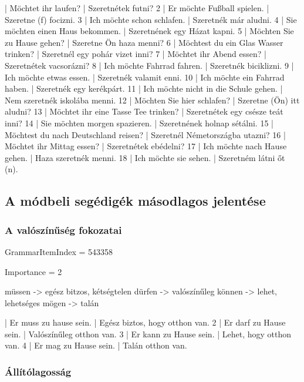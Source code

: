 \documentclass{article}
\newenvironment{desc}{\verbatim}{\endverbatim}
\newenvironment{exmp}{\verbatim}{\endverbatim}
\begin{document}
\begin{exmp}
1 | Möchtet ihr laufen? | Szeretnétek futni?
2 | Er möchte Fußball spielen. | Szeretne (f) focizni.
3 | Ich möchte schon schlafen. | Szeretnék már aludni.
4 | Sie möchten einen Haus bekommen. | Szeretnének egy Házat kapni.
5 | Möchten Sie zu Hause gehen? | Szeretne Ön haza menni?
6 | Möchtest du ein Glas Wasser trinken? | Szeretnél egy pohár vizet inni?
7 | Möchtet ihr Abend essen? | Szeretnétek vacsorázni?
8 | Ich möchte Fahrrad fahren. | Szeretnék biciklizni.
9 | Ich möchte etwas essen. | Szeretnék valamit enni.
10 | Ich möchte ein Fahrrad haben. | Szeretnék egy kerékpárt.
11 | Ich möchte nicht in die Schule gehen. | Nem szeretnék iskolába menni.
12 | Möchten Sie hier schlafen? | Szeretne (Ön) itt aludni?
13 | Möchtet ihr eine Tasse Tee trinken? | Szeretnétek egy csésze teát inni?
14 | Sie möchten morgen spazieren. | Szeretnének holnap sétálni.
15 | Möchtest du nach Deutschland reisen? | Szeretnél Németországba utazni?
16 | Möchtet ihr Mittag essen? | Szeretnétek ebédelni?
17 | Ich möchte nach Hause gehen. | Haza szeretnék menni.
18 | Ich möchte sie sehen. | Szeretném látni őt (n).
\end{exmp}

\subsection{A módbeli segédigék másodlagos jelentése}

\subsubsection{A valószínűség fokozatai}

GrammarItemIndex = 543358

Importance = 2

\begin{desc}
müssen -> egész bitzos, kétségtelen
dürfen -> valószínűleg
können -> lehet, lehetséges
mögen -> talán
\end{desc}

\begin{exmp}
1 | Er muss zu hause sein. | Egész biztos, hogy otthon van.
2 | Er darf zu Hause sein. | Valószínűleg otthon van.
3 | Er kann zu Hause sein. | Lehet, hogy otthon van.
4 | Er mag zu Hause sein. | Talán otthon van.
\end{exmp}

\subsubsection{Állítólagosság}
\end{document}
